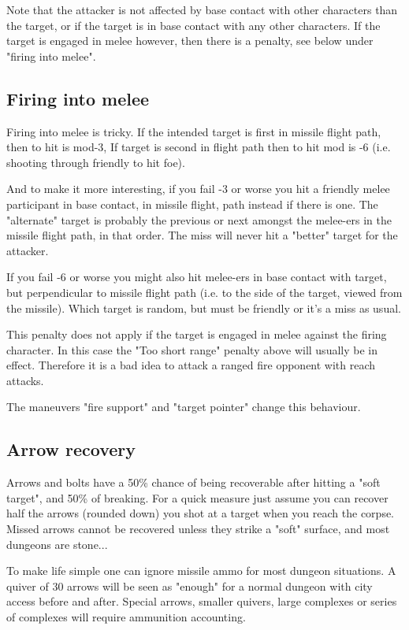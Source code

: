 Note that the attacker is not affected by base contact with other characters than the target, or if the target is in base contact with any other characters. If the target is engaged in melee however, then there is a penalty, see below under "firing into melee".


\subsection*{Firing into melee}
Firing into melee is tricky. If the intended target is first in missile flight path, then to hit is mod-3, If target is second in flight path then to hit mod is -6 (i.e. shooting through friendly to hit foe).

And to make it more interesting, if you fail -3 or worse you hit a friendly melee participant in base contact, in missile flight, path instead if there is one. The "alternate" target is probably the previous or next amongst the melee-ers in the missile flight path, in that order. The miss will never hit a "better" target for the attacker.

If you fail -6 or worse you might also hit melee-ers in base contact with target, but perpendicular to missile flight path (i.e. to the side of the target, viewed from the missile). Which target is random, but must be friendly or it's a miss as usual.

This penalty does not apply if the target is engaged in melee against the firing character. In this case the "Too short range" penalty above will usually be in effect. Therefore it is a bad idea to attack a ranged fire opponent with reach attacks.

The maneuvers "fire support" and "target pointer" change this behaviour.


\subsection*{Arrow recovery}
Arrows and bolts have a 50\% chance of being recoverable after hitting a "soft target", and 50\% of breaking. For a quick measure just assume you can recover half the arrows (rounded down) you shot at a target when you reach the corpse.
Missed arrows cannot be recovered unless they strike a "soft" surface, and most dungeons are stone...

To make life simple one can ignore missile ammo for most dungeon situations. A quiver of 30 arrows will be seen as "enough" for a normal dungeon with city access before and after. Special arrows, smaller quivers, large complexes or series of complexes will require ammunition accounting.

